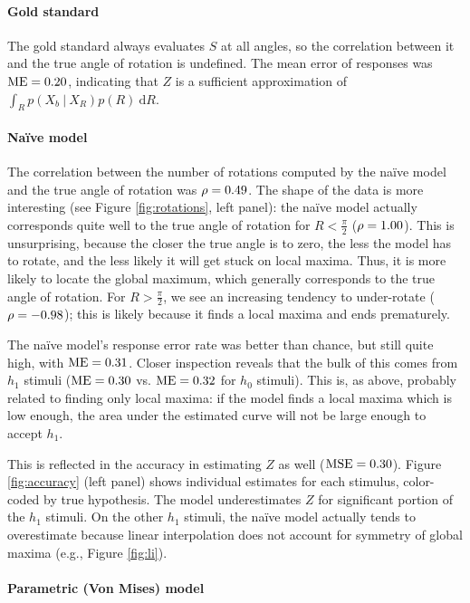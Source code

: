 \documentclass{article} %
\newcommand{\naive}[0]{na\"ive}
\newcommand{\Naive}[0]{Na\"ive}
\begin{document}
\paragraph{Gold standard} 

The gold standard always evaluates $S$ at all angles, so the
correlation between it and the true angle of rotation is
undefined. The mean error of responses was $\mathrm{ME}{}=0.20{}$, indicating that
$Z$ is a sufficient approximation of $\int_R p(X_b\ \vert\ X_R)p(R)\
\mathrm{d}R$.

\paragraph{\Naive{} model} 

The correlation between the number of rotations computed by the
\naive{} model and the true angle of rotation was $\rho=0.49{}$. The
shape of the data is more interesting (see Figure \ref{fig:rotations},
left panel): the \naive{} model actually corresponds quite well to the
true angle of rotation for $R<\frac{\pi}{2}$ ($\rho=1.00{}$). This
is unsurprising, because the closer the true angle is to zero, the
less the model has to rotate, and the less likely it will get stuck on
local maxima. Thus, it is more likely to locate the global maximum,
which generally corresponds to the true angle of rotation. For
$R>\frac{\pi}{2}$, we see an increasing tendency to under-rotate
($\rho=-0.98{}$); this is likely because it finds a local maxima and
ends prematurely.

The \naive{} model's response error rate was better than chance, but
still quite high, with $\mathrm{ME}{}=0.31{}$. Closer inspection reveals that
the bulk of this comes from $h_1$ stimuli ($\mathrm{ME}{}=0.30{}$
vs. $\mathrm{ME}{}=0.32{}$ for $h_0$ stimuli). This is, as above, probably
related to finding only local maxima: if the model finds a local
maxima which is low enough, the area under the estimated curve will
not be large enough to accept $h_1$.

This is reflected in the accuracy in estimating $Z$ as well
($\mathrm{MSE}{}=0.30{}$). Figure \ref{fig:accuracy} (left panel) shows
individual estimates for each stimulus, color-coded by true
hypothesis. The model underestimates $Z$ for significant portion of
the $h_1$ stimuli. On the other $h_1$ stimuli, the \naive{} model
actually tends to overestimate because linear interpolation does not
account for symmetry of global maxima (e.g., Figure \ref{fig:li}).

\paragraph{Parametric (Von Mises) model}
\end{document}
